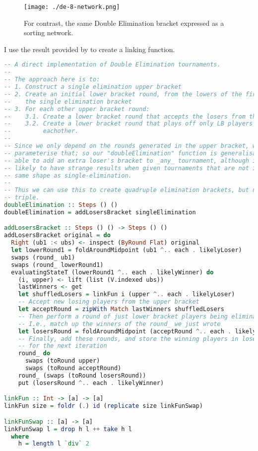\documentclass[a4,11pt,twoside,final,hidelinks]{article}
\begin{document}
\begin{figure}[htbp]
\centering
\texttt{[image: ./de-8-network.png]}
\caption{For contrast, the same Double Elimination bracket expressed as a sorting network.}
\end{figure}

I use the result provided by \autocite{double-elim-structure-efficacy-manipulation}
to create a linking function.

\begin{lstlisting}[language=haskell,numbers=none,basicstyle=\ttfamily\small]
-- A direct implementation of Double Elimination tournaments.
--
-- The approach here is to:
-- 1. Construct a single elimination upper bracket
-- 2. Create an initial lower bracket round, from the lowers of the first round of
--    the single elimination bracket
-- 3. For each other upper bracket round:
--    3.1. Create a lower bracket round that accepts the losers from that round
--    3.2. Create a lower bracket round that plays off only LB players against
--         eachother.
--
-- Since we only depend on the rounds generated in the upper bracket, we can
-- parameterise that; so our "doubleElimination" function is generalisable to be
-- able to add an extra loser's bracket to _any_ tournament, although it is
-- likely to have strange results when given tournaments that are not in the
-- same shape as single-elimination.
--
-- Thus we can use this to create quadruple elimination brackets, but not
-- triple.
doubleElimination :: Steps () ()
doubleElimination = addLosersBracket singleElimination

addLosersBracket :: Steps () () -> Steps () ()
addLosersBracket original = do
  Right (ub1 :< ubs) <- inspect (ByRound Flat) original
  let lowerRound1 = foldAroundMidpoint (ub1 ^.. each . likelyLoser)
  swaps (round_ ub1)
  swaps (round_ lowerRound1)
  evaluatingStateT (lowerRound1 ^.. each . likelyWinner) do
    (i, upper) <- lift (list (V.indexed ubs))
    lastWinners <- get
    let shuffledLosers = linkFun i (upper ^.. each . likelyLoser)
    -- Accept new losing players from the upper bracket
    let acceptRound = zipWith Match lastWinners shuffledLosers
    -- Then perform a round of just lower bracket players being eliminated
    -- I.e., match up the winners of the round_ we just wrote
    let losersRound = foldAroundMidpoint (acceptRound ^.. each . likelyWinner)
    -- Finally, add these rounds, and store the winning players in losersRound
    -- for the next iteration
    round_ do
      swaps (toRound upper)
      swaps (toRound acceptRound)
    round_ (swaps (toRound losersRound))
    put (losersRound ^.. each . likelyWinner)

linkFun :: Int -> [a] -> [a]
linkFun size = foldr (.) id (replicate size linkFunSwap)

linkFunSwap :: [a] -> [a]
linkFunSwap l = drop h l ++ take h l
  where
    h = length l `div` 2
\end{lstlisting}
\end{document}
